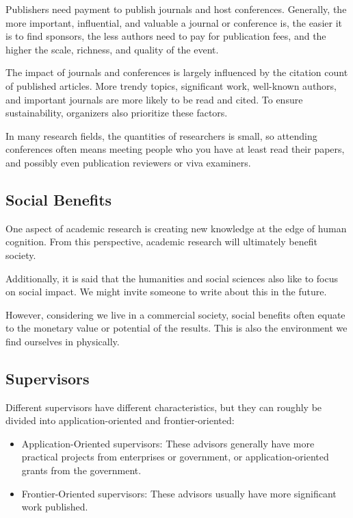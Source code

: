 Publishers need payment to publish journals and host conferences. Generally, the more important, influential, and valuable a journal or conference is, the easier it is to find sponsors, the less authors need to pay for publication fees, and the higher the scale, richness, and quality of the event.

The impact of journals and conferences is largely influenced by the citation count of published articles. More trendy topics, significant work, well-known authors, and important journals are more likely to be read and cited. To ensure sustainability, organizers also prioritize these factors.

In many research fields, the quantities of researchers is small, so attending conferences often means meeting people who you have at least read their papers, and possibly even publication reviewers or viva examiners.


\subsection{Social Benefits}
One aspect of academic research is creating new knowledge at the edge of human cognition. From this perspective, academic research will ultimately benefit society.

Additionally, it is said that the humanities and social sciences also like to focus on social impact. We might invite someone to write about this in the future.

However, considering we live in a commercial society, social benefits often equate to the monetary value or potential of the results. This is also the environment we find ourselves in physically.


\subsection{Supervisors}
Different supervisors have different characteristics, but they can roughly be divided into application-oriented and frontier-oriented:
\begin{itemize}
    \item Application-Oriented supervisors: These advisors generally have more practical projects from enterprises or government, or application-oriented grants from the government.
    \item Frontier-Oriented supervisors: These advisors usually have more significant work published.
\end{itemize}


